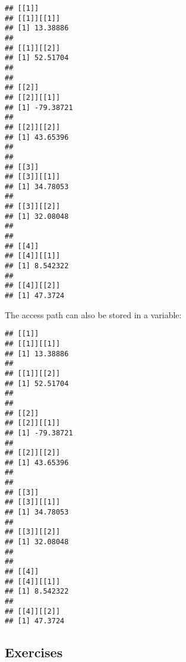 \documentclass[]{book}
\newenvironment{Shaded}{\begin{snugshade}}{\end{snugshade}}
\newcommand{\DecValTok}[1]{\textcolor[rgb]{0.00,0.00,0.81}{#1}}
\newcommand{\KeywordTok}[1]{\textcolor[rgb]{0.13,0.29,0.53}{\textbf{#1}}}
\newcommand{\NormalTok}[1]{#1}
\newcommand{\OperatorTok}[1]{\textcolor[rgb]{0.81,0.36,0.00}{\textbf{#1}}}
\newcommand{\StringTok}[1]{\textcolor[rgb]{0.31,0.60,0.02}{#1}}
\begin{document}
\begin{verbatim}
## [[1]]
## [[1]][[1]]
## [1] 13.38886
## 
## [[1]][[2]]
## [1] 52.51704
## 
## 
## [[2]]
## [[2]][[1]]
## [1] -79.38721
## 
## [[2]][[2]]
## [1] 43.65396
## 
## 
## [[3]]
## [[3]][[1]]
## [1] 34.78053
## 
## [[3]][[2]]
## [1] 32.08048
## 
## 
## [[4]]
## [[4]][[1]]
## [1] 8.542322
## 
## [[4]][[2]]
## [1] 47.3724
\end{verbatim}

The access path can also be stored in a variable:

\begin{Shaded}
\end{Shaded}

\begin{verbatim}
## [[1]]
## [[1]][[1]]
## [1] 13.38886
## 
## [[1]][[2]]
## [1] 52.51704
## 
## 
## [[2]]
## [[2]][[1]]
## [1] -79.38721
## 
## [[2]][[2]]
## [1] 43.65396
## 
## 
## [[3]]
## [[3]][[1]]
## [1] 34.78053
## 
## [[3]][[2]]
## [1] 32.08048
## 
## 
## [[4]]
## [[4]][[1]]
## [1] 8.542322
## 
## [[4]][[2]]
## [1] 47.3724
\end{verbatim}

\hypertarget{exercises-21}{%
\subsection{Exercises}\label{exercises-21}}
\end{document}
